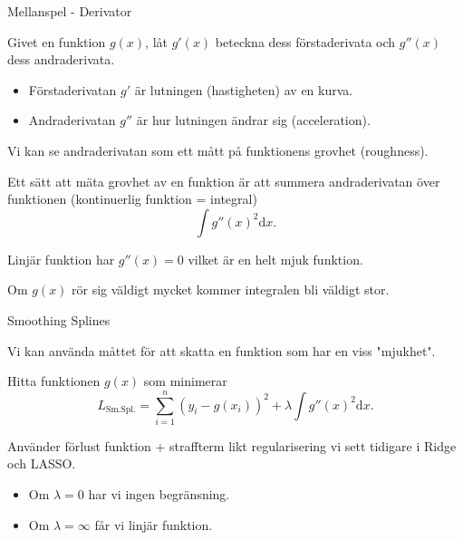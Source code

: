 \documentclass[10pt,english]{beamer}
\begin{document}
\begin{frame}{Mellanspel - Derivator}

    Givet en funktion $g(x)$, låt $g'(x)$ beteckna dess förstaderivata och $g''(x)$ dess andraderivata.

    \begin{itemize}
        \item Förstaderivatan $g'$ är lutningen (hastigheten) av en kurva.
        \item Andraderivatan $g''$ är hur lutningen ändrar sig (acceleration).
    \end{itemize}

    Vi kan se andraderivatan som ett mått på funktionens grovhet (roughness).

    Ett sätt att mäta grovhet av en funktion är att summera andraderivatan över funktionen (kontinuerlig funktion = integral)
    \begin{equation*}
        \int g''(x)^2 \mathrm{d}x.
    \end{equation*}

    Linjär funktion har $g''(x) = 0$ vilket är en helt mjuk funktion.

    Om $g(x)$ rör sig väldigt mycket kommer integralen bli väldigt stor.
\end{frame}

\begin{frame}{Smoothing Splines}

    Vi kan använda måttet för att skatta en funktion som har en viss "mjukhet".

    \begin{greenbox}
        Hitta funktionen $g(x)$ som minimerar
        \begin{equation*}
            L_{\text{Sm.Spl.}} = \sum_{i=1}^{n}(y_i - g(x_i))^2 + \lambda \int g''(x)^2 \mathrm{d}x.
        \end{equation*}
    \end{greenbox}
    
    Använder förlust funktion + straffterm likt regularisering vi sett tidigare i Ridge och LASSO.

    \begin{itemize}
        \item Om $\lambda = 0$ har vi ingen begränsning.
        \item Om $\lambda = \infty$ får vi linjär funktion.
    \end{itemize}
\end{frame}
\end{document}
